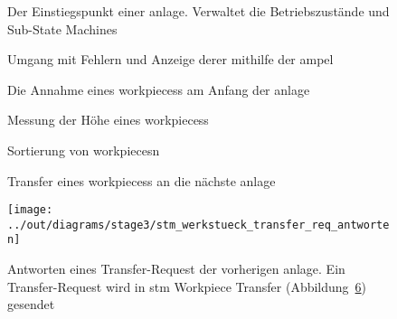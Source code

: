 \begin{figure}
    \caption{Der Einstiegspunkt einer \gls{anlage}.
    Verwaltet die Betriebszustände und Sub-State Machines}
    \label{fig:stm_top_level}
\end{figure}

\begin{figure}
    \caption{Umgang mit Fehlern und Anzeige derer mithilfe der \gls{ampel}}
    \label{fig:stm_error}
\end{figure}

\begin{figure}
    \caption{Die Annahme eines \glspl{workpiece}s am Anfang der \gls{anlage}}
    \label{fig:stm_werkstueck_annahme}
\end{figure}

\begin{figure}
    \caption{Messung der Höhe eines \glspl{workpiece}s}
    \label{fig:stm_hoehe_messen}
\end{figure}

\begin{figure}
    \caption{Sortierung von \glspl{workpiece}n}
    \label{fig:stm_werkstueck_sortieren}
\end{figure}

\begin{figure}
    \caption{Transfer eines \glspl{workpiece}s an die nächste \gls{anlage}}
    \label{fig:stm_werkstueck_transfer}
\end{figure}

\begin{figure}
    \centering
    \texttt{[image: ../out/diagrams/stage3/stm\_werkstueck\_transfer\_req\_antworten]}
    \caption{Antworten eines Transfer-Request der vorherigen \gls{anlage}.
    Ein Transfer-Request wird in stm Workpiece Transfer (Abbildung~\ref{fig:stm_werkstueck_transfer}) gesendet}
    \label{fig:stm_werkstueck_transfer_req_antworten}
\end{figure}



